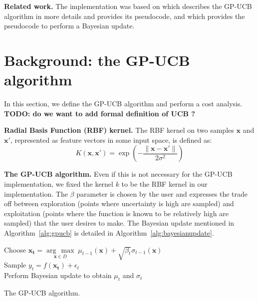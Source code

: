 \documentclass[letterpaper]{article}
\newcommand{\argmax}[1]{\underset{#1}{\operatorname{arg}\,\operatorname{max}}\;}
\newcommand{\mypar}[1]{{\bf #1.}}
\begin{document}
\mypar{Related work} The implementation was based on \cite{Krause:09} which describes the GP-UCB algorithm in more details and provides its pseudocode, and \cite{rasmussen2006gaussian} which provides the pseudocode to perform a Bayesian update.

\section{Background: the GP-UCB algorithm}\label{sec:background}

In this section, we define the GP-UCB algorithm and perform a cost analysis. \textbf{TODO: do we want to add formal definition of UCB ?}

\mypar{Radial Basis Function (RBF) kernel}
The RBF kernel on two samples $\mathbf{x}$ and $\mathbf{x'}$, represented as feature vectors in some input space, is defined as:
\begin{equation*}
    K(\mathbf{x}, \mathbf{x'}) = \exp\left(-\frac{\lVert \mathbf{x} - \mathbf{x'} \rVert}{2\sigma^2}\right)
\end{equation*}

\mypar{The GP-UCB algorithm}
Even if this is not necessary for the GP-UCB implementation, we fixed the kernel $k$ to be the RBF kernel in our implementation. The $\beta$ parameter is chosen by the user and expresses the trade off between exploration (points where uncertainty is high are sampled) and exploitation (points where the function is known to be relatively high are sampled) that the user desires to make. The Bayesian update mentioned in Algorithm~\ref{alg:gpucb} is detailed in Algorithm~\ref{alg:bayesianupdate}.
\begin{algorithm}
    \label{alg:gpucb}
        {
            Choose $\mathbf{x_t} = \argmax{\mathbf{x}\in D} \mu_{t-1}(\mathbf{x}) + \sqrt{\beta_t}\sigma_{t-1}(\mathbf{x})$\\
            Sample $y_t=f(\mathbf{x_t}) + \epsilon_t$\\
            Perform Bayesian update to obtain $\mu_t$ and $\sigma_t$
        }
    \caption{The GP-UCB algorithm.}
\end{algorithm}
\end{document}

